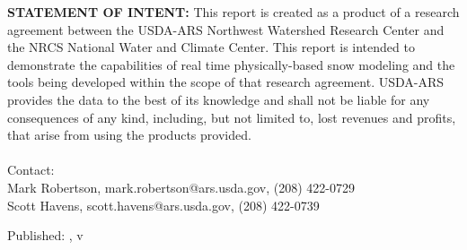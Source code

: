 \documentclass[11pt, oneside]{article}
\begin{document}
\vspace{1cm}


\noindent\textbf{STATEMENT OF INTENT:} This report is created as a product of a research agreement between the USDA-ARS Northwest Watershed Research Center and the NRCS National Water and Climate Center. This report is intended to demonstrate the capabilities of real time physically-based snow modeling and the tools being developed within the scope of that research agreement. USDA-ARS provides the data to the best of its knowledge and shall not be liable for any consequences of any kind, including, but not limited to, lost revenues and profits, that arise from using the products provided. \\
\vspace{1cm}  \\
\noindent
Contact: \\
\hspace{2cm} Mark Robertson, mark.robertson@ars.usda.gov, (208) 422-0729 \\
\hspace{2cm} Scott Havens, scott.havens@ars.usda.gov, (208) 422-0739 \\

\par\vspace*{\fill}
\noindent
\footnotesize{
Published: , v
}
\end{document}
